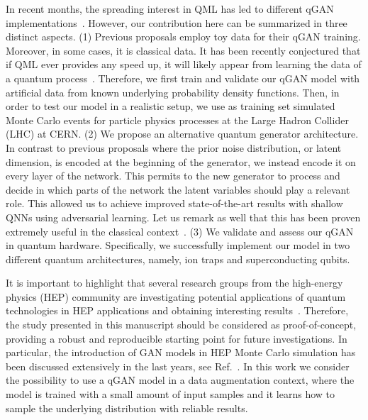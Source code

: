 \documentclass[twocolumn,preprintnumbers,superscriptaddress]{revtex4-2}
\begin{document}
In recent months, the spreading interest in QML has led to different qGAN
implementations~\cite{zoufal2019quantum, zeng2019learning, situ2020quantum,
  hu2019quantum, benedetti2019adversarial, romero2021variational,
  niu2021entangling}. However, our contribution here can be summarized in three
distinct aspects. (1) Previous proposals employ toy data for their qGAN
training. Moreover, in some cases, it is classical data. It has been recently
conjectured that if QML ever provides any speed up, it will likely appear from
learning the data of a quantum process~\cite{huang2021information,
  kubler2021inductive}. Therefore, we first train and validate our qGAN model with
artificial data from known underlying probability density functions. Then, in
order to test our model in a realistic setup, we use as training set simulated
Monte Carlo events for particle physics processes at the Large Hadron Collider
(LHC) at CERN. (2) We propose an alternative quantum generator architecture. In contrast to
previous proposals where the prior noise distribution, or latent dimension, is
encoded at the beginning of the generator, we instead encode it on every layer
of the network. This permits to the new generator to process and decide in which
parts of the network the latent variables should play a relevant role. This
allowed us to achieve improved state-of-the-art results with shallow QNNs using
adversarial learning. Let us remark as well that this has been proven extremely
useful in the classical context~\cite{karras2019style}. (3) We validate and
assess our qGAN in quantum hardware. Specifically, we successfully implement our
model in two different quantum architectures, namely, ion traps and
superconducting qubits.

It is important to highlight that several research groups from the high-energy
physics (HEP) community are investigating potential applications of quantum
technologies in HEP applications and obtaining interesting
results~\cite{P_rez_Salinas_2021,Guan_2021,chang2021quantum,Chang_2021,Belis_2021,khattak2021fast}.
Therefore, the study presented in this manuscript should be considered as
proof-of-concept, providing a robust and reproducible starting point for future
investigations. In particular, the introduction of GAN models in HEP Monte Carlo
simulation has been discussed extensively in the last years, see
Ref.~\cite{baldi2021gan,Backes_2021,butter2020generative,Butter_2021,Butter_2020,Bellagente_2020,Butter_2019}.
In this work we consider the possibility to use a qGAN model in a data
augmentation context, where the model is trained with a small amount of input
samples and it learns how to sample the underlying distribution with reliable
results.
\end{document}
